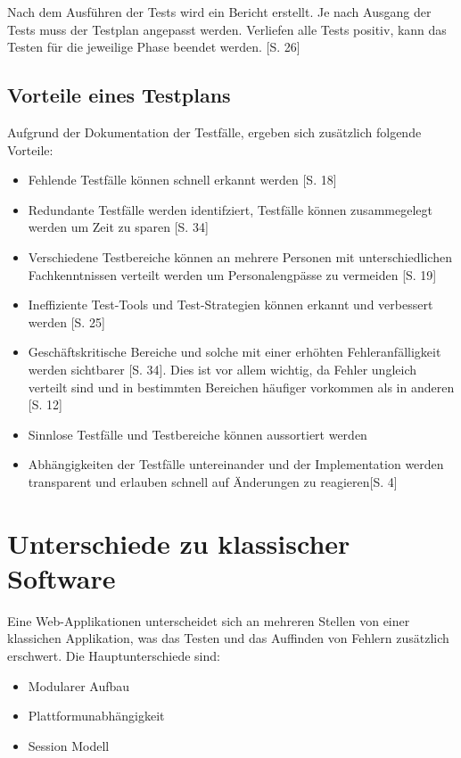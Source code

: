 \documentclass[a4paper,bibtotoc,oneside]{scrbook}
\begin{document}
Nach dem Ausführen der Tests wird ein Bericht erstellt. Je nach Ausgang der Tests muss der Testplan angepasst werden. Verliefen alle Tests positiv, kann das Testen für die jeweilige Phase beendet werden. \cite{eval_regression}[S. 26]


\section{Vorteile eines Testplans}

Aufgrund der Dokumentation der Testfälle, ergeben sich zusätzlich folgende Vorteile:

\begin{itemize}
	\item Fehlende Testfälle können schnell erkannt werden \cite{test_large_systems}[S. 18]
	\item Redundante Testfälle werden identifziert, Testfälle können zusammegelegt werden um Zeit zu sparen \cite{testing_apps_on_web}[S. 34]
	\item Verschiedene Testbereiche können an mehrere Personen mit unterschiedlichen Fachkenntnissen verteilt werden um Personalengpässe zu vermeiden \cite{test_large_systems}[S. 19]
	\item Ineffiziente Test-Tools und Test-Strategien können erkannt und verbessert werden \cite{eval_regression}[S. 25]
	\item Geschäftskritische Bereiche und solche mit einer erhöhten  Fehleranfälligkeit werden sichtbarer \cite{testing_apps_on_web}[S. 34]. Dies ist vor allem wichtig, da Fehler ungleich verteilt sind und in bestimmten Bereichen häufiger vorkommen als in anderen \cite{eval_regression}[S. 12]
	\item Sinnlose Testfälle und Testbereiche können aussortiert werden 
	\item Abhängigkeiten der Testfälle untereinander und der Implementation werden transparent und erlauben schnell auf Änderungen zu reagieren\cite{test_auto}[S. 4]
\end{itemize}


\chapter{Unterschiede zu klassischer Software}
Eine Web-Applikationen unterscheidet sich an mehreren Stellen von einer klassichen Applikation, was das Testen und das Auffinden von Fehlern zusätzlich erschwert. Die Hauptunterschiede sind:

\begin{itemize}
	\item Modularer Aufbau
	\item Plattformunabhängigkeit
	\item Session Modell
\end{itemize}
\end{document}
